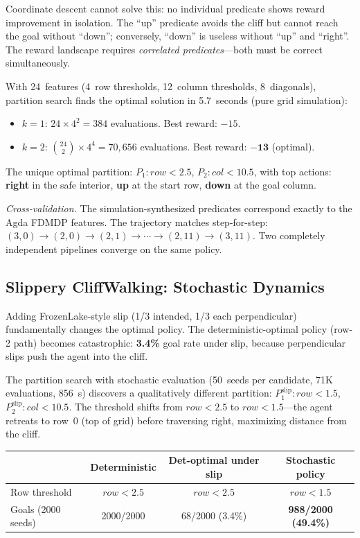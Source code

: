 \documentclass[9pt,a4paper]{article}
\theoremstyle{plain}
\theoremstyle{definition}
\theoremstyle{remark}
\begin{document}
Coordinate descent cannot solve this: no individual predicate shows reward improvement in isolation.  The ``up'' predicate avoids the cliff but cannot reach the goal without ``down''; conversely, ``down'' is useless without ``up'' and ``right''.  The reward landscape requires \emph{correlated predicates}---both must be correct simultaneously.

With 24~features (4~row thresholds, 12~column thresholds, 8~diagonals), partition search finds the optimal solution in 5.7~seconds (pure grid simulation):
\begin{itemize}
  \item $k=1$: $24 \times 4^2 = 384$ evaluations.  Best reward: $-15$.
  \item $k=2$: $\binom{24}{2} \times 4^4 = 70{,}656$ evaluations.  Best reward: $\mathbf{-13}$ (optimal).
\end{itemize}
The unique optimal partition: $P_1: \textit{row} < 2.5$, $P_2: \textit{col} < 10.5$, with top actions: \textbf{right} in the safe interior, \textbf{up} at the start row, \textbf{down} at the goal column.

\emph{Cross-validation.}  The simulation-synthesized predicates correspond exactly to the Agda FDMDP features.  The trajectory matches step-for-step: $(3,0) \to (2,0) \to (2,1) \to \cdots \to (2,11) \to (3,11)$.  Two completely independent pipelines converge on the same policy.

\subsection{Slippery CliffWalking: Stochastic Dynamics}

Adding FrozenLake-style slip (1/3 intended, 1/3 each perpendicular) fundamentally changes the optimal policy.  The deterministic-optimal policy (row-2 path) becomes catastrophic: \textbf{3.4\%} goal rate under slip, because perpendicular slips push the agent into the cliff.

The partition search with stochastic evaluation (50~seeds per candidate, 71K evaluations, 856~s) discovers a qualitatively different partition:
$P_1^{\text{slip}}: \textit{row} < 1.5$, $P_2^{\text{slip}}: \textit{col} < 10.5$.
The threshold shifts from $\textit{row} < 2.5$ to $\textit{row} < 1.5$---the agent retreats to row~0 (top of grid) before traversing right, maximizing distance from the cliff.

\begin{center}
\small
\begin{tabular}{@{}lccc@{}}
  & \textbf{Deterministic} & \textbf{Det-optimal under slip} & \textbf{Stochastic policy} \\
\hline
Row threshold & $\textit{row} < 2.5$ & $\textit{row} < 2.5$ & $\textit{row} < 1.5$ \\
Goals (2000 seeds) & 2000/2000 & 68/2000 (3.4\%) & \textbf{988/2000 (49.4\%)} \\
\end{tabular}
\end{center}
\end{document}

